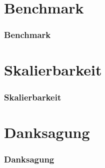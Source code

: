 \documentclass[ddcfooter]{tudbeamer}
\begin{document}
\section{Benchmark}
\begin{frame}
    \frametitle*{Benchmark}
    
\end{frame}
\section{Skalierbarkeit}
\begin{frame}
    \frametitle*{Skalierbarkeit}
    
\end{frame}
\section{Danksagung}

\begin{frame}
    \frametitle*{Danksagung}
    
\end{frame}
\end{document}
